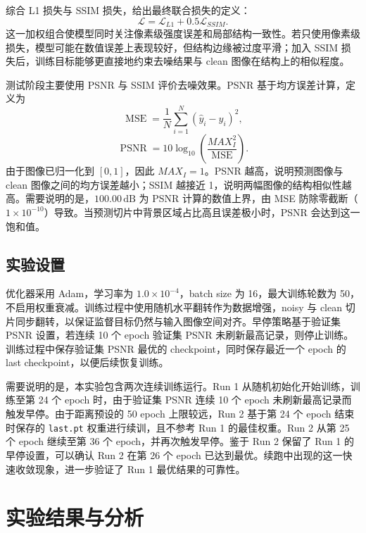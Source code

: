 \documentclass[UTF8,a4paper,12pt]{ctexart}
\begin{document}
综合 L1 损失与 SSIM 损失，给出最终联合损失的定义：
\begin{equation}
\mathcal{L}=\mathcal{L}_{L1}+0.5\mathcal{L}_{SSIM}.
\end{equation}
这一加权组合使模型同时关注像素级强度误差和局部结构一致性。若只使用像素级损失，模型可能在数值误差上表现较好，但结构边缘被过度平滑；加入 SSIM 损失后，训练目标能够更直接地约束去噪结果与 clean 图像在结构上的相似程度。

测试阶段主要使用 PSNR 与 SSIM 评价去噪效果。PSNR 基于均方误差计算，定义为
\begin{equation}
\operatorname{MSE}=\frac{1}{N}\sum_{i=1}^{N}(\hat{y}_i-y_i)^2 ,
\end{equation}
\begin{equation}
\operatorname{PSNR}=10\log_{10}\left(\frac{MAX_I^2}{\operatorname{MSE}}\right).
\end{equation}
由于图像已归一化到 $[0,1]$，因此 $MAX_I=1$。PSNR 越高，说明预测图像与 clean 图像之间的均方误差越小；SSIM 越接近 1，说明两幅图像的结构相似性越高。需要说明的是，$100.00\,\mathrm{dB}$ 为 PSNR 计算的数值上界，由 MSE 防除零截断（$1\times10^{-10}$）导致。当预测切片中背景区域占比高且误差极小时，PSNR 会达到这一饱和值。

\subsection{实验设置}

优化器采用 Adam，学习率为 $1.0\times10^{-4}$，batch size 为 16，最大训练轮数为 50，不启用权重衰减。训练过程中使用随机水平翻转作为数据增强，noisy 与 clean 切片同步翻转，以保证监督目标仍然与输入图像空间对齐。早停策略基于验证集 PSNR 设置，若连续 10 个 epoch 验证集 PSNR 未刷新最高记录，则停止训练。训练过程中保存验证集 PSNR 最优的 checkpoint，同时保存最近一个 epoch 的 last checkpoint，以便后续恢复训练。

需要说明的是，本实验包含两次连续训练运行。Run 1 从随机初始化开始训练，训练至第 24 个 epoch 时，由于验证集 PSNR 连续 10 个 epoch 未刷新最高记录而触发早停。由于距离预设的 50 epoch 上限较远，Run 2 基于第 24 个 epoch 结束时保存的 \texttt{last.pt} 权重进行续训，且不参考 Run 1 的最佳权重。Run 2 从第 25 个 epoch 继续至第 36 个 epoch，并再次触发早停。鉴于 Run 2 保留了 Run 1 的早停设置，可以确认 Run 2 在第 26 个 epoch 已达到最优。续跑中出现的这一快速收敛现象，进一步验证了 Run 1 最优结果的可靠性。

\section{实验结果与分析}
\end{document}
